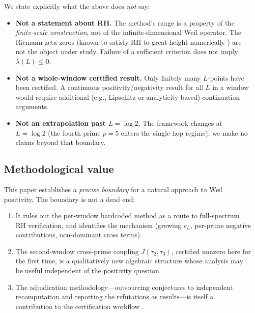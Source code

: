 \documentclass[12pt,a4paper]{amsart}
\theoremstyle{plain}
\theoremstyle{definition}
\newcommand{\cL}{c_L}
\newcommand{\Jcross}{J(\tau_2,\tau_3)}
\begin{document}
We state explicitly what the above does \emph{not} say:
\begin{itemize}[leftmargin=2em]
  \item \textbf{Not a statement about RH.}  The method's range is a property
    of the \emph{finite-scale construction}, not of the infinite-dimensional
    Weil operator.  The Riemann zeta zeros (known to satisfy RH to great
    height numerically \cite{PlattTrudgian2021}) are not the object under study.
    Failure of a sufficient criterion does not imply $\lambda(L) \le 0$.

  \item \textbf{Not a whole-window certified result.}  Only finitely many
    $L$-points have been certified.  A continuous positivity/negativity
    result for all $L$ in a window would require additional (e.g.,
    Lipschitz or analyticity-based) continuation arguments.

  \item \textbf{Not an extrapolation past $L = \log 2$.}  The framework
    changes at $L = \log 2$ (the fourth prime $p=5$ enters the single-hop
    regime); we make no claims beyond that boundary.
\end{itemize}

\subsection{Methodological value}

This paper establishes a \emph{precise boundary} for a natural approach to
Weil positivity.  The boundary is not a dead end:

\begin{enumerate}[leftmargin=2em,label=(\arabic*)]
  \item It rules out the per-window hardcoded method as a route to
    full-spectrum RH verification, and identifies the mechanism (growing
    $\cL$, per-prime negative contributions, non-dominant cross terms).

  \item The second-window cross-prime coupling $\Jcross$, certified nonzero
    here for the first time, is a qualitatively new algebraic structure whose
    analysis may be useful independent of the positivity question.

  \item The adjudication methodology---outsourcing conjectures to independent
    recomputation and reporting the refutations as results---is itself a
    contribution to the certification workflow \cite{Tao2026Proofctl}.
\end{enumerate}
\end{document}
